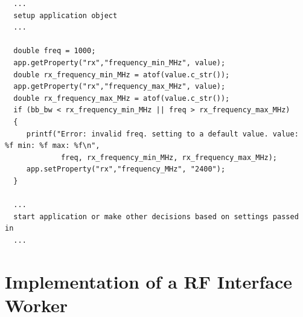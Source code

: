 \begin{verbatim}
  ...
  setup application object
  ...

  double freq = 1000;
  app.getProperty("rx","frequency_min_MHz", value);
  double rx_frequency_min_MHz = atof(value.c_str());
  app.getProperty("rx","frequency_max_MHz", value);
  double rx_frequency_max_MHz = atof(value.c_str());
  if (bb_bw < rx_frequency_min_MHz || freq > rx_frequency_max_MHz)
  {
     printf("Error: invalid freq. setting to a default value. value: %f min: %f max: %f\n",
             freq, rx_frequency_min_MHz, rx_frequency_max_MHz);
     app.setProperty("rx","frequency_MHz", "2400");
  }

  ...
  start application or make other decisions based on settings passed in
  ...
\end{verbatim}
\newpage
\section{Implementation of a RF Interface Worker}


